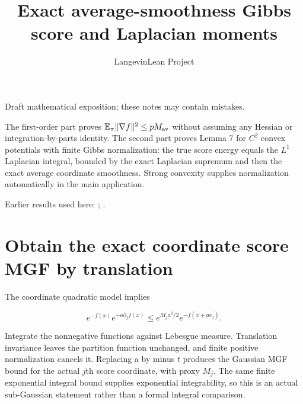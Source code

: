 \documentclass[11pt,a4paper]{article}
\title{\texorpdfstring{Exact average-smoothness Gibbs score and Laplacian moments}{Exact average-smoothness Gibbs score and Laplacian moments}}
\author{LangevinLean Project}
\date{}
\begin{document}
\maketitle
Draft mathematical exposition; these notes may contain mistakes.


The first-order part proves \(\mathbb E_\pi\|\nabla f\|^2\le pM_{\rm av}\) without assuming any Hessian or integration-by-parts identity. The second part proves Lemma 7 for \(C^{2}\) convex potentials with finite Gibbs normalization: the true score energy equals the \(L^{1}\) Laplacian integral, bounded by the exact Laplacian supremum and then the exact average coordinate smoothness. Strong convexity supplies normalization automatically in the main application.



Earlier results used here: \cite[Section~3.27]{LangevinLean2026ULASC}; \cite[Section~3.46]{LangevinLean2026ULASC}.

\section{\texorpdfstring{Obtain the exact coordinate score MGF by translation}{Obtain the exact coordinate score MGF by translation}}


The coordinate quadratic model implies

\[e^{-f(x)}e^{-a\partial_j f(x)}\le e^{M_j a^2/2}e^{-f(x+ae_j)}.\]

Integrate the nonnegative functions against Lebesgue measure. Translation invariance leaves the partition function unchanged, and finite positive normalization cancels it. Replacing a by minus \(t\) produces the Gaussian MGF bound for the actual \(j\)th score coordinate, with proxy \(M_j\). The same finite exponential integral bound supplies exponential integrability, so this is an actual sub-Gaussian statement rather than a formal integral comparison.
\end{document}
